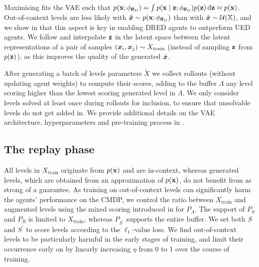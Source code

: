 Maximising  fits the VAE such that $p({\mathbf{x}}; \phi_{{\bm{\theta}}_D}) = \int p({\mathbf{x}} \mid {\mathbf{z}}; \phi_{{\bm{\theta}}_D}) p({\mathbf{z}}) \mathop{}\!\mathrm{d} {\mathbf{z}} \approx p({\mathbf{x}})$. Out-of-context levels are less likely with $\tilde{{\bm{x}}} \sim p({\mathbf{x}}; \phi_{{\bm{\theta}}_D})$ than with $\tilde{{\bm{x}}} \sim \mathcal{U}({\mathbb{X}})$, and we show in  that this aspect is key in enabling DRED agents to outperform UED agents. %
We follow \citet{smileVAE} and interpolate ${\mathbf{z}}$ in the latent space between the latent representations of a pair of samples $({\bm{x}}_i, {\bm{x}}_j) \sim X_\text{train}$ (instead of sampling ${\mathbf{z}}$ from $p({\mathbf{z}})$), as this improves the quality of the generated $\tilde{{\bm{x}}}$.

After generating a batch of levels parameters $\tilde{X}$ we collect rollouts (without updating agent weights) to compute their scores, adding to the buffer $\Lambda$ any level scoring higher than the lowest scoring generated level in $\Lambda$. We only consider levels solved at least once during rollouts for inclusion, to ensure that unsolvable levels do not get added in. We provide additional details on the VAE architecture, hyperparameters and pre-training process in .

\subsection{The replay phase}
All levels in $X_\text{train}$ originate from $p({\mathbf{x}})$ and are in-context, whereas generated levels, which are obtained from an approximation of $p({\mathbf{x}})$, do not benefit from as strong of a guarantee. As training on out-of-context levels can significantly harm the agents' performance on the CMDP, we control the ratio between $X_\text{train}$ and augmented levels using the mixed scoring introduced in  for $P_\Lambda$. The support of $P_S$ and $P_R$ is limited to $X_\text{train}$, whereas $P_{S^\prime}$ supports the entire buffer. We set both $S$ and $S^\prime$ to score levels according to the $\ell_1$-value loss. We find out-of-context levels to be particularly harmful in the early stages of training, and limit their occurrence early on by linearly increasing $\eta$ from 0 to 1 over the course of training.
